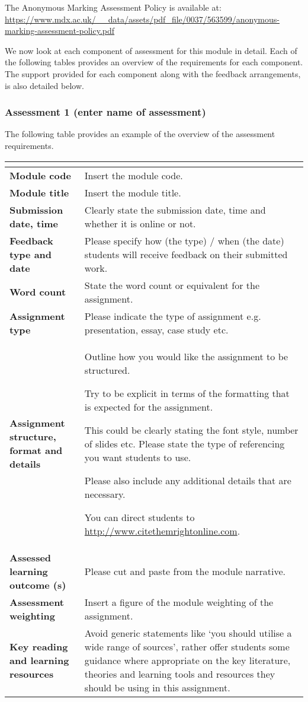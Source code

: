 \documentclass{MDXHandbook}
\begin{document}
The Anonymous Marking Assessment Policy is available at: 
\url{https://www.mdx.ac.uk/__data/assets/pdf_file/0037/563599/anonymous-marking-assessment-policy.pdf}

We now look at each component of assessment for this module in detail. Each of the following tables provides an overview of the requirements for each component. The support provided for each component along with the feedback arrangements, is also detailed below. 


\newpage
\begin{landscape}
	\subsubsection{Assessment 1 (enter name of assessment)}
	The following table provides an example of the overview of the assessment requirements. 

	\begin{tabular}{|>{\bfseries}p{.35\linewidth}|p{.55\linewidth}|}
		\rowcolor{MDXCorporateRed}\hline 
		\multicolumn{2}{|c|}{\textcolor{white}{Example --- Assessment brief presentation}}\\
		\hline
		Module code & Insert the module code.\\ \hline
		Module title & Insert the module title.\\\hline
		Submission date, time & Clearly state the submission date, time and whether it is online or not.\\\hline
		Feedback type and date  & Please specify how (the type) / when (the date) students will receive feedback on their submitted work.\\\hline
		Word count & State the word count or equivalent for the assignment.\\\hline
		Assignment type & Please indicate the type of assignment e.g. presentation, essay, case study etc.\\\hline
		Assignment structure, format and details & Outline how you would like the assignment to be structured.

		Try to be explicit in terms of the formatting that is expected for the assignment. 

		This could be clearly stating the font style, number of slides etc. 
		Please state the type of referencing you want students to use. 

		Please also include any additional details that are necessary. 

		You can direct students to \url{http://www.citethemrightonline.com}.
		\\\hline
		Assessed learning outcome (s) & Please cut and paste from the module narrative.\\\hline
		Assessment weighting  & Insert a figure of the module weighting of the assignment.\\\hline
		Key reading and learning resources & Avoid generic statements like ‘you should utilise a wide range of sources’, rather offer students some guidance where appropriate on the key literature, theories and learning tools and resources they should be using in this assignment. \\
		\hline
	\end{tabular}


\end{landscape}
\end{document}
